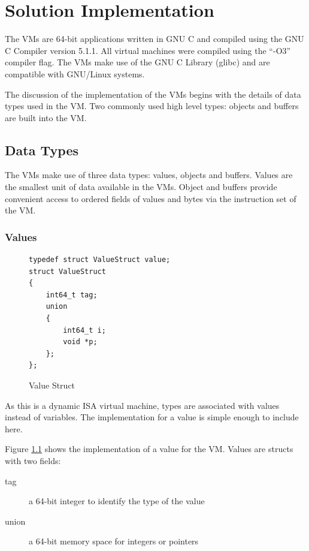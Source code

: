 \documentclass[english,a4paper,12pt]{report}
\begin{document}
\chapter{Solution Implementation}

The VMs are 64-bit applications written in GNU C and compiled using
the GNU C Compiler version 5.1.1. All virtual machines were compiled
using the ``-O3'' compiler flag. The VMs make use of the GNU C Library
(glibc) and are compatible with GNU/Linux systems.

The discussion of the implementation of the VMs begins with the
details of data types used in the VM. Two commonly used high level
types: objects and buffers are built into the VM.

\section{Data Types}
The VMs make use of three data types: values, objects and
buffers. Values are the smallest unit of data available in the
VMs. Object and buffers provide convenient access to ordered fields of
values and bytes via the instruction set of the VM.

\subsection{Values}
\label{values-implementation}

\begin{figure}[!htb]

	\begin{lstlisting}
typedef struct ValueStruct value; 
struct ValueStruct 
{ 
    int64_t tag; 
    union 
    { 
        int64_t i; 
        void *p; 
    }; 
};
	\end{lstlisting}
	\caption{Value Struct}
		\label{fig:struct}
\end{figure}

As this is a dynamic ISA virtual machine, types are associated with
values instead of variables\cite{RobertoIerusalimschy}. The
implementation for a value is simple enough to include here.

Figure \ref{fig:struct} shows the implementation of a value for the
VM. Values are structs with two fields:
\begin{description}
	\item[tag] a 64-bit integer to identify the type of the value
	\item[union] a 64-bit memory space for integers or pointers
\end{description}
\end{document}

